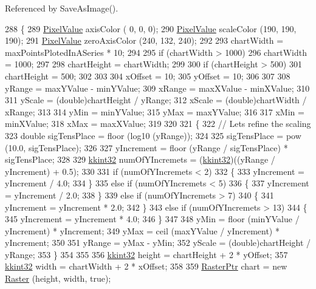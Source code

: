 Referenced by Save\+As\+Image().


\begin{DoxyCode}
288 \{
289   \hyperlink{class_k_k_b_1_1_pixel_value}{PixelValue}  axisColor     (  0,   0,   0);
290   \hyperlink{class_k_k_b_1_1_pixel_value}{PixelValue}  scaleColor    (190, 190, 190);
291   \hyperlink{class_k_k_b_1_1_pixel_value}{PixelValue}  zeroAxisColor (240, 132, 240);
292 
293   chartWidth = maxPointsPlotedInASeries * 10;
294 
295   \textcolor{keywordflow}{if}  (chartWidth > 1000)
296     chartWidth = 1000;
297 
298   chartHeight = chartWidth;
299 
300   \textcolor{keywordflow}{if}  (chartHeight > 500)
301     chartHeight = 500;
302 
303 
304   xOffset = 10;
305   yOffset = 10;
306 
307   
308   yRange = maxYValue - minYValue;
309   xRange = maxXValue - minXValue;
310 
311   yScale = (double)chartHeight / yRange;
312   xScale = (double)chartWidth  / xRange;
313 
314   yMin = minYValue;
315   yMax = maxYValue;
316 
317   xMin = minXValue;
318   xMax = maxXValue;
319   
320 
321   \{
322     \textcolor{comment}{// Lets refine the scaling}
323     \textcolor{keywordtype}{double}  sigTensPlace = floor (log10 (yRange));
324 
325     sigTensPlace = pow (10.0, sigTensPlace);
326 
327     yIncrement = floor (yRange / sigTensPlace) * sigTensPlace;
328 
329     \hyperlink{namespace_k_k_b_a8fa4952cc84fda1de4bec1fbdd8d5b1b}{kkint32}  numOfYIncremets = (\hyperlink{namespace_k_k_b_a8fa4952cc84fda1de4bec1fbdd8d5b1b}{kkint32})((yRange / yIncrement) + 0.5);
330 
331     \textcolor{keywordflow}{if}  (numOfYIncremets < 2)
332     \{
333       yIncrement = yIncrement / 4.0;
334     \}
335     \textcolor{keywordflow}{else} \textcolor{keywordflow}{if}  (numOfYIncremets < 5)
336     \{
337       yIncrement = yIncrement / 2.0;
338     \}
339     \textcolor{keywordflow}{else} \textcolor{keywordflow}{if}  (numOfYIncremets > 7)
340     \{
341       yIncrement = yIncrement * 2.0;
342     \}
343     \textcolor{keywordflow}{else} \textcolor{keywordflow}{if}  (numOfYIncremets > 13)
344     \{
345       yIncrement = yIncrement * 4.0;
346     \}
347 
348     yMin = floor (minYValue / yIncrement) * yIncrement;
349     yMax = ceil  (maxYValue / yIncrement) * yIncrement;
350 
351     yRange = yMax - yMin;
352     yScale = (double)chartHeight / yRange;
353   \}
354 
355 
356   \hyperlink{namespace_k_k_b_a8fa4952cc84fda1de4bec1fbdd8d5b1b}{kkint32}  height = chartHeight + 2 * yOffset;
357   \hyperlink{namespace_k_k_b_a8fa4952cc84fda1de4bec1fbdd8d5b1b}{kkint32}  width  = chartWidth  + 2 * xOffset;
358 
359   \hyperlink{class_k_k_b_1_1_raster}{RasterPtr}  chart = \textcolor{keyword}{new} \hyperlink{class_k_k_b_1_1_raster}{Raster} (height, width, \textcolor{keyword}{true});

\end{DoxyCode}
